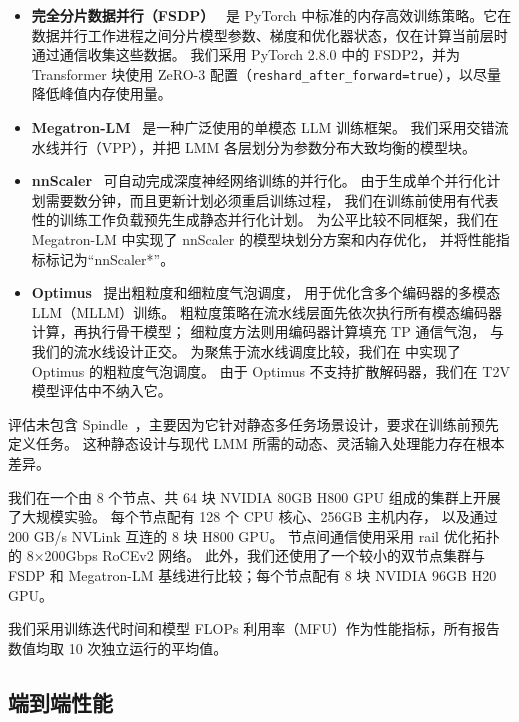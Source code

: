 \begin{itemize}
    \item \textbf{完全分片数据并行（FSDP）}~\cite{fsdp-arxiv23} 是 PyTorch 中标准的内存高效训练策略。它在数据并行工作进程之间分片模型参数、梯度和优化器状态，仅在计算当前层时通过通信收集这些数据。
    我们采用 PyTorch 2.8.0 中的 FSDP2，并为 Transformer 块使用 ZeRO-3 配置（\texttt{reshard\_after\_forward=true}），以尽量降低峰值内存使用量。
    \item \textbf{Megatron-LM}~\cite{megatron-lm-arxiv20} 是一种广泛使用的单模态 LLM 训练框架。
    我们采用交错流水线并行（VPP），并把 LMM 各层划分为参数分布大致均衡的模型块。
    \item \textbf{nnScaler}~\cite{nnscaler-osdi24}
    可自动完成深度神经网络训练的并行化。
    由于生成单个并行化计划需要数分钟，而且更新计划必须重启训练过程，
    我们在训练前使用有代表性的训练工作负载预先生成静态并行化计划。
    为公平比较不同框架，我们在 Megatron-LM 中实现了 nnScaler 的模型块划分方案和内存优化，
    并将性能指标标记为“nnScaler*”。
    \item \textbf{Optimus}~\cite{optimus-atc25}
    提出粗粒度和细粒度气泡调度，
    用于优化含多个编码器的多模态 LLM（MLLM）训练。
    粗粒度策略在流水线层面先依次执行所有模态编码器计算，再执行骨干模型；
    细粒度方法则用编码器计算填充 TP 通信气泡，
    与我们的流水线设计正交。
    为聚焦于流水线调度比较，我们在 \sys{} 中实现了 Optimus 的粗粒度气泡调度。
    由于 Optimus 不支持扩散解码器，我们在 T2V 模型评估中不纳入它。
\end{itemize}

评估未包含 Spindle~\cite{spindle-asplos25}，主要因为它针对静态多任务场景设计，要求在训练前预先定义任务。
这种静态设计与现代 LMM 所需的动态、灵活输入处理能力存在根本差异。

我们在一个由 8 个节点、共 64 块 NVIDIA 80GB H800 GPU 组成的集群上开展了大规模实验。
每个节点配有 128 个 CPU 核心、256GB 主机内存，
以及通过 200 GB/s NVLink 互连的 8 块 H800 GPU。
节点间通信使用采用 rail 优化拓扑的 8$\times$200Gbps RoCEv2 网络。
此外，我们还使用了一个较小的双节点集群与 FSDP 和 Megatron-LM 基线进行比较；每个节点配有 8 块 NVIDIA 96GB H20 GPU。

\par\noindent
我们采用训练迭代时间和模型 FLOPs 利用率（MFU）作为性能指标，所有报告数值均取 10 次独立运行的平均值。

\subsection{端到端性能}
\label{section:e2e-performance}

